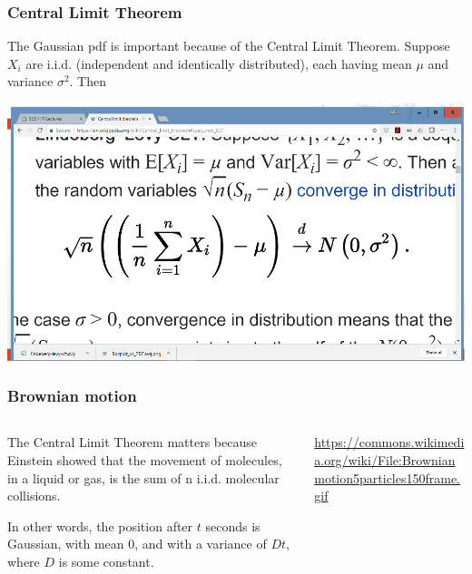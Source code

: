 \documentclass{beamer}
\begin{document}
\begin{frame}
  \frametitle{Central Limit Theorem}

  The Gaussian pdf is important because of the Central Limit Theorem.
  Suppose $X_i$ are i.i.d. (independent and identically distributed),
  each having mean $\mu$ and variance $\sigma^2$.  Then
  \centerline{\includegraphics[height=0.5\textheight]{figs/clt.png}}
\end{frame}

\begin{frame}
  \frametitle{Brownian motion}
  \begin{columns}
    \begin{column}{0.5\textwidth}
      The Central Limit Theorem matters because Einstein showed that
      the movement of molecules, in a liquid or gas, is the sum of n
      i.i.d. molecular collisions.

      In other words, the position after $t$ seconds is Gaussian, with
      mean 0, and with a variance of $Dt$, where $D$ is some constant.
    \end{column}
    \begin{column}{0.5\textwidth}
      \centerline{}

      \url{https://commons.wikimedia.org/wiki/File:Brownianmotion5particles150frame.gif}
    \end{column}
  \end{columns}
\end{frame}
\end{document}

